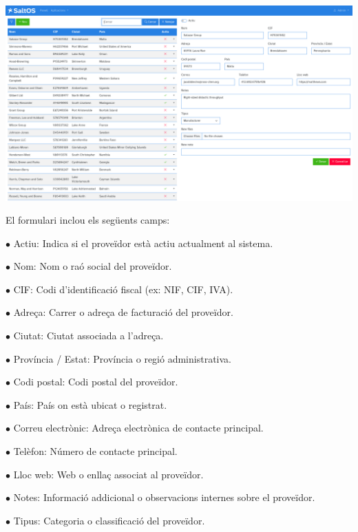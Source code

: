 \documentclass[a4paper]{article}
\begin{document}
\begin{center}\includegraphics[width=1\textwidth]{../ujest/snaps/test-screenshots-js-screenshots-purchases-suppliers-edit-100-ca-es-1-snap.png}\end{center}

El formulari inclou els següents camps:

\begin{compactitem}
\item[\color{myblue}$\bullet$] Actiu: Indica si el proveïdor està actiu actualment al sistema.
\item[\color{myblue}$\bullet$] Nom: Nom o raó social del proveïdor.
\item[\color{myblue}$\bullet$] CIF: Codi d'identificació fiscal (ex: NIF, CIF, IVA).
\item[\color{myblue}$\bullet$] Adreça: Carrer o adreça de facturació del proveïdor.
\item[\color{myblue}$\bullet$] Ciutat: Ciutat associada a l'adreça.
\item[\color{myblue}$\bullet$] Província / Estat: Província o regió administrativa.
\item[\color{myblue}$\bullet$] Codi postal: Codi postal del proveïdor.
\item[\color{myblue}$\bullet$] País: País on està ubicat o registrat.
\item[\color{myblue}$\bullet$] Correu electrònic: Adreça electrònica de contacte principal.
\item[\color{myblue}$\bullet$] Telèfon: Número de contacte principal.
\item[\color{myblue}$\bullet$] Lloc web: Web o enllaç associat al proveïdor.
\item[\color{myblue}$\bullet$] Notes: Informació addicional o observacions internes sobre el proveïdor.
\item[\color{myblue}$\bullet$] Tipus: Categoria o classificació del proveïdor.
\end{compactitem}
\end{document}
